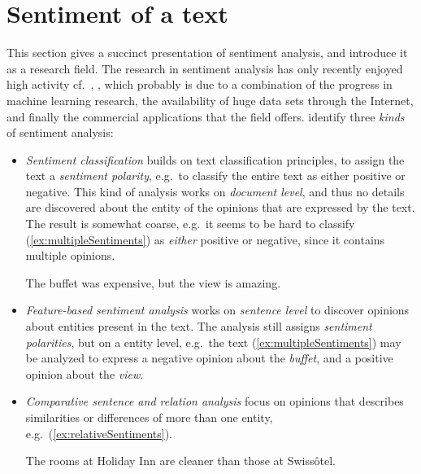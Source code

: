 \section{Sentiment of a text}
This section gives a succinct presentation of sentiment analysis, and introduce it as a research field. The research in sentiment analysis has only recently enjoyed high activity cf.\ \cite{webDataMining}, \cite{omsa}, which probably is due to a combination of the progress in machine learning research, the availability of huge data sets through the Internet, and finally the commercial applications that the field offers. \citeauthor{webDataMining}  identify three \emph{kinds} of sentiment analysis:
\begin{itemize}
	\item \emph{Sentiment classification} builds on text classification principles, to assign the text a \emph{sentiment polarity}, e.g.\ to classify the entire text as either positive or negative. This kind of analysis works on \emph{document level}, and thus no details are discovered about the entity of the opinions that are expressed by the text. The result is somewhat coarse, e.g.\ it  seems to be hard to classify (\ref{ex:multipleSentiments}) as \emph{either} positive or negative, since it contains multiple opinions.
	\vspace{1em}
	\begin{numquote}
		The buffet was expensive, but the view is amazing.
		\label{ex:multipleSentiments}
	\end{numquote}
	\item \emph{Feature-based sentiment analysis} works on \emph{sentence level} to discover opinions about entities present in the text. The analysis still assigns \emph{sentiment polarities}, but on a entity level, e.g.\ the text (\ref{ex:multipleSentiments}) may be analyzed to express a negative opinion about the \emph{buffet}, and a positive opinion about the \emph{view}.
	\item \emph{Comparative sentence and relation analysis} focus on opinions that describes similarities or differences of more than one entity, e.g.\ (\ref{ex:relativeSentiments}).
	\vspace{1em}
	\begin{numquote1}
		The rooms at Holiday Inn are cleaner than those at Swissôtel.		
		\label{ex:relativeSentiments}		
	\end{numquote1}	
\end{itemize}

